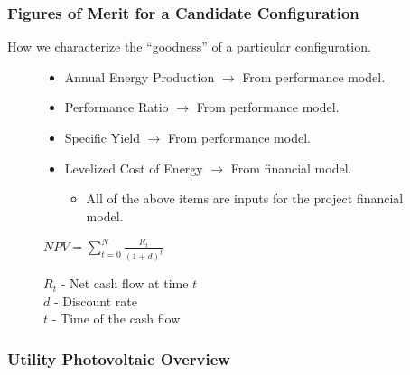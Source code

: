 \documentclass[aspectratio=169]{beamer}
\begin{document}
\begin{frame}
  \frametitle{Figures of Merit for a Candidate Configuration}
  How we characterize the ``goodness'' of a particular configuration.
  
  \begin{figure}

  \begin{itemize}
  \item Annual Energy Production $\rightarrow$ From performance model.
  \item Performance Ratio $\rightarrow$ From performance model.
  \item Specific Yield $\rightarrow$ From performance model.
  \item Levelized Cost of Energy $\rightarrow$ From financial model.
    \begin{itemize}
    \item All of the above items are inputs for the project financial model.
    \end{itemize}
  \end{itemize}
    
    \center
    $NPV=\displaystyle\sum\limits_{t=0}^N\frac{R_{t}}{(1+d)^t}$
  \end{figure}
  \begin{figure}
    \raggedright
    \scriptsize
    $R_{t}$ - Net cash flow at time $t$\\
    $d$ - Discount rate\\
    $t$ - Time of the cash flow
  \end{figure}
\end{frame}

\begin{frame}
  \frametitle{Utility Photovoltaic Overview}
\end{frame}
\end{document}
